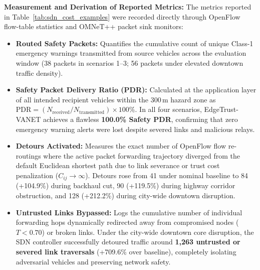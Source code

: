 \documentclass[conference]{IEEEtran}
\begin{document}
\textbf{Measurement and Derivation of Reported Metrics:} 
The metrics reported in Table~\ref{tab:sdn_cost_examples} were recorded directly through OpenFlow flow-table statistics and OMNeT++ packet sink monitors:
\begin{itemize}
    \item \textbf{Routed Safety Packets:} Quantifies the cumulative count of unique Class-1 emergency warnings transmitted from source vehicles across the evaluation window (38 packets in scenarios 1--3; 56 packets under elevated downtown traffic density).
    \item \textbf{Safety Packet Delivery Ratio (PDR):} Calculated at the application layer of all intended recipient vehicles within the $300\,\text{m}$ hazard zone as $\text{PDR} = (N_{\text{received}} / N_{\text{transmitted}}) \times 100\%$. In all four scenarios, EdgeTrust-VANET achieves a flawless \textbf{100.0\% Safety PDR}, confirming that zero emergency warning alerts were lost despite severed links and malicious relays.
    \item \textbf{Detours Activated:} Measures the exact number of OpenFlow flow re-routings where the active packet forwarding trajectory diverged from the default Euclidean shortest path due to link severance or trust cost penalization ($C_{ij} \to \infty$). Detours rose from 41 under nominal baseline to 84 (+104.9\%) during backhaul cut, 90 (+119.5\%) during highway corridor obstruction, and 128 (+212.2\%) during city-wide downtown disruption.
    \item \textbf{Untrusted Links Bypassed:} Logs the cumulative number of individual forwarding hops dynamically redirected away from compromised nodes ($T < 0.70$) or broken links. Under the city-wide downtown core disruption, the SDN controller successfully detoured traffic around \textbf{1,263 untrusted or severed link traversals} (+709.6\% over baseline), completely isolating adversarial vehicles and preserving network safety.
\end{itemize}

\begin{table}[htbp]
\centering
\caption{Measured SDN Adaptive Forwarding Performance Under Network Faults}
\label{tab:sdn_cost_examples}
\end{table}
\end{document}
